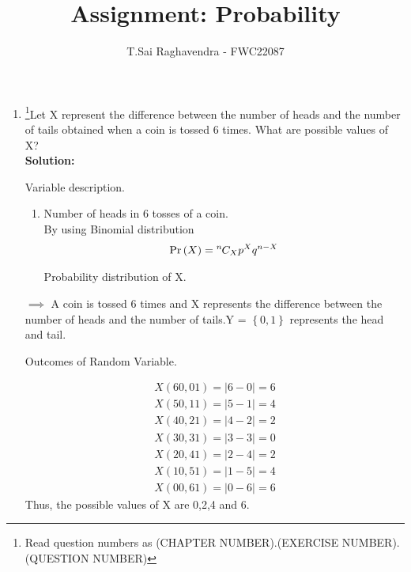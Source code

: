 \documentclass{article}
\providecommand{\pr}[1]{\ensuremath{\Pr\left(#1\right)}}
\providecommand{\brak}[1]{\ensuremath{\left\{#1\right\}}}
\newcommand*{\permcomb}[4][0mu]{{{}^{#3}\mkern#1#2_{#4}}}
\newcommand*{\comb}[1][-1mu]{\permcomb[#1]{C}}
\newcommand{\solution}{\noindent \textbf{Solution: }}
\begin{document}
\title{Assignment: Probability}
\author{\Large T.Sai Raghavendra - FWC22087}
\date{}


\maketitle
\begin{enumerate}[label=13.\arabic{enumi}.\arabic{enumii}]%
\setcounter{enumi}{3}
\setcounter{enumii}{3}

\item \footnote{Read question numbers as (CHAPTER NUMBER).(EXERCISE NUMBER).(QUESTION NUMBER)}Let X represent the difference between the number of heads and the number of tails obtained when a coin is tossed 6 times. What are possible values of X?\\

\solution

	\begin{table}[h]
	\centering
	
	\caption{Variable description.}
	\label{tables:13.4.3.2}
	\end{table}
	
\begin{enumerate}
\item Number of heads in 6 tosses of a coin.\\
By using Binomial distribution
\begin{align}
\pr{X} = \comb{n}{X}p^{X}q^{n-X}
\end{align}
	\begin{table}[h]
	\centering
	
	\caption{Probability distribution of X.}
	\label{tables:13.4.3.2}
	\end{table}
\end{enumerate}


$\implies$ A coin is tossed 6 times and X represents the difference between the number of heads and the number of tails.Y = $\brak{0,1}$ represents the head and tail.\\

	\begin{table}[h]
	\centering
	
	\caption{Outcomes of Random Variable.}
	\label{tables:13.4.3.2}
	\end{table}
	
\begin{align}
X(60,01) = |6-0| = 6\\
X(50,11) = |5-1| = 4\\
X(40,21) = |4-2| = 2\\
X(30,31) = |3-3| = 0\\
X(20,41) = |2-4| = 2\\
X(10,51) = |1-5| = 4\\
X(00,61) = |0-6| = 6
\end{align}
Thus, the possible values of X are 0,2,4 and 6.
\end{enumerate}
\end{document}
